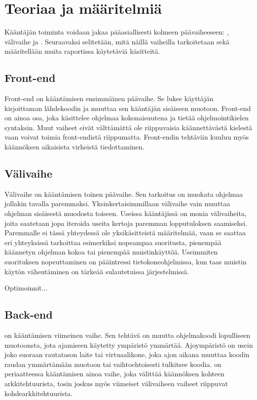 
\section{Teoriaa ja määritelmiä}
Kääntäjän toiminta voidaan jakaa pääasiallisesti kolmeen päävaiheeseen:
, välivaihe ja .
Seuraavaksi selitetään, mitä näillä vaiheilla tarkoitetaan
sekä määritellään muita raportissa käytetäviä käsitteitä.


\subsection{Front-end}
Front-end on kääntämisen ensimmäinen päävaihe.
Se lukee käyttäjän kirjoittaman lähdekoodin
ja muuttaa sen kääntäjän sisäiseen muotoon.
Front-end on ainoa osa, joka käsittelee ohjelmaa kokonaisuutena
ja tietää ohjelmointikielen syntaksin.
Muut vaiheet eivät välttämättä ole riippuvaisia käännettävästä
kielestä vaan voivat toimia front-endistä riippumatta.
Front-endin tehtäviin kuuluu myös käännöksen aikaisista virheistä tiedottaminen.

\subsection{Välivaihe}
Välivaihe on kääntämisen toinen päävaihe.
Sen tarkoitus on muokata ohjelmaa jollakin tavalla paremmaksi.
Yksinkertaisimmillaan välivaihe vain muuttaa ohjelman sisäisestä
muodosta toiseen.
Useissa kääntäjissä on monia välivaiheita, joita saatetaan jopa
iteroida useita kertoja paremman lopputuloksen saamiseksi.
Paremmalle ei tässä yhteydessä ole yksikäsitteistä määritelmää,
vaan se saattaa eri yhteyksissä tarkoittaa esimerkiksi
nopeampaa suoritusta, pienempää käännetyn ohjelman kokoa
tai pienempää muistinkäyttöä. Useimmiten suorituksen nopeuttaminen
on pääintressi tietokoneohjelmissa, kun taas muistin käytön
vähentäminen on tärkeää sulautetuissa järjestelmissä.

Optimoinnit...

\subsection{Back-end}
 on kääntämisen viimeinen vaihe.
Sen tehtävä on muutta ohjelmakoodi lopulliseen muotoonsta,
jota ajamiseen käytetty ympäristö ymmärtää.
Ajoympäristö on usein joko suoraan rautatason laite
tai virtuaalikone, joka ajon aikana muuttaa koodin raudan ymmärtämään muotoon
tai vaihtoehtoisesti tulkitsee koodia.
 on periaatteessa kääntämisen ainoa vaihe,
joka välittää käännöksen kohteen arkkitehtuurista,
tosin joskus myös viimeiset välivaiheen vaiheet riippuvat kohdearkkitehtuurista.

